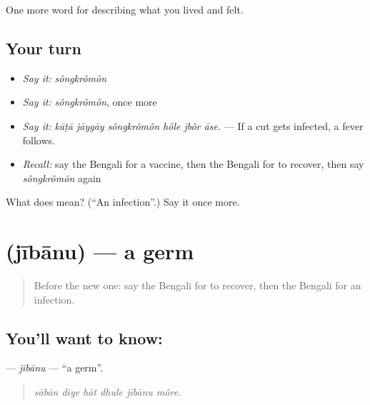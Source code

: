 \begin{grammarlens}[title={What you've built}]
One more word for describing what you lived and felt.
\end{grammarlens}

\subsection*{Your turn}
\begin{itemize}
\raggedright
  \item \emph{Say it:} \emph{sôngkrômôn}
  \item \emph{Say it:} \emph{sôngkrômôn}, once more
  \item \emph{Say it:} \emph{kāṭā jāygāy sôngkrômôn hôle jbôr āse.} — If a cut gets infected, a fever follows.
  \item \emph{Recall:} say the Bengali for a vaccine, then the Bengali for to recover, then say \emph{sôngkrômôn} again
\end{itemize}

\begin{tcolorbox}[breakable,colback=teal!4,colframe=teal!35!black,title={Before you move on}]
What does  mean? (\textquotedblleft{}An infection\textquotedblright{}.) Say it once more.
\end{tcolorbox}
\section[\texorpdfstring{\bn{জীবাণু} (jībānu)}{জীবাণু (jībānu)}]{ (jībānu) — a germ}

\label{lesson:BN-C473-jibanu}



\begin{quote}
Before the new one: say the Bengali for to recover, then the Bengali for an infection.
\end{quote}

\subsection*{You'll want to know: }
\textbf{} — \emph{jībānu} — \textquotedblleft{}a germ\textquotedblright{}.

\begin{quote}
     
\end{quote}

\begin{quote}
\emph{sābān diye hāt dhule jībānu môre.}
\end{quote}

